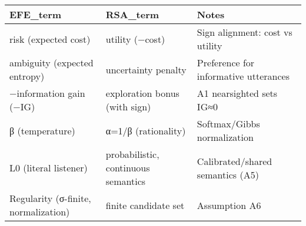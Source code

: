 \begin{tabular}{lll}
\toprule
EFE\_term & RSA\_term & Notes \\
\midrule
risk (expected cost) & utility (−cost) & Sign alignment: cost vs utility \\
ambiguity (expected entropy) & uncertainty penalty & Preference for informative utterances \\
−information gain (−IG) & exploration bonus (with sign) & A1 nearsighted sets IG≈0 \\
β (temperature) & α=1/β (rationality) & Softmax/Gibbs normalization \\
L0 (literal listener) & probabilistic, continuous semantics & Calibrated/shared semantics (A5) \\
Regularity (σ-finite, normalization) & finite candidate set & Assumption A6 \\
\bottomrule
\end{tabular}
